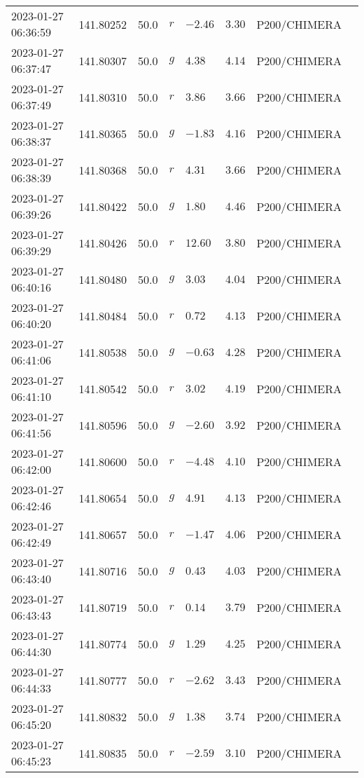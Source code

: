 \documentclass{nature_plusfigure}
\begin{document}
\begin{supplement}
\begin{center}
\begin{longtable}{llllllll}
2023-01-27 06:36:59 & 141.80252 & 50.0 & $r$ & $-2.46$ & $3.30$ & P200/CHIMERA &  \\ 
2023-01-27 06:37:47 & 141.80307 & 50.0 & $g$ & $4.38$ & $4.14$ & P200/CHIMERA &  \\ 
2023-01-27 06:37:49 & 141.80310 & 50.0 & $r$ & $3.86$ & $3.66$ & P200/CHIMERA &  \\ 
2023-01-27 06:38:37 & 141.80365 & 50.0 & $g$ & $-1.83$ & $4.16$ & P200/CHIMERA &  \\ 
2023-01-27 06:38:39 & 141.80368 & 50.0 & $r$ & $4.31$ & $3.66$ & P200/CHIMERA &  \\ 
2023-01-27 06:39:26 & 141.80422 & 50.0 & $g$ & $1.80$ & $4.46$ & P200/CHIMERA &  \\ 
2023-01-27 06:39:29 & 141.80426 & 50.0 & $r$ & $12.60$ & $3.80$ & P200/CHIMERA &  \\ 
2023-01-27 06:40:16 & 141.80480 & 50.0 & $g$ & $3.03$ & $4.04$ & P200/CHIMERA &  \\ 
2023-01-27 06:40:20 & 141.80484 & 50.0 & $r$ & $0.72$ & $4.13$ & P200/CHIMERA &  \\ 
2023-01-27 06:41:06 & 141.80538 & 50.0 & $g$ & $-0.63$ & $4.28$ & P200/CHIMERA &  \\ 
2023-01-27 06:41:10 & 141.80542 & 50.0 & $r$ & $3.02$ & $4.19$ & P200/CHIMERA &  \\ 
2023-01-27 06:41:56 & 141.80596 & 50.0 & $g$ & $-2.60$ & $3.92$ & P200/CHIMERA &  \\ 
2023-01-27 06:42:00 & 141.80600 & 50.0 & $r$ & $-4.48$ & $4.10$ & P200/CHIMERA &  \\ 
2023-01-27 06:42:46 & 141.80654 & 50.0 & $g$ & $4.91$ & $4.13$ & P200/CHIMERA &  \\ 
2023-01-27 06:42:49 & 141.80657 & 50.0 & $r$ & $-1.47$ & $4.06$ & P200/CHIMERA &  \\ 
2023-01-27 06:43:40 & 141.80716 & 50.0 & $g$ & $0.43$ & $4.03$ & P200/CHIMERA &  \\ 
2023-01-27 06:43:43 & 141.80719 & 50.0 & $r$ & $0.14$ & $3.79$ & P200/CHIMERA &  \\ 
2023-01-27 06:44:30 & 141.80774 & 50.0 & $g$ & $1.29$ & $4.25$ & P200/CHIMERA &  \\ 
2023-01-27 06:44:33 & 141.80777 & 50.0 & $r$ & $-2.62$ & $3.43$ & P200/CHIMERA &  \\ 
2023-01-27 06:45:20 & 141.80832 & 50.0 & $g$ & $1.38$ & $3.74$ & P200/CHIMERA &  \\ 
2023-01-27 06:45:23 & 141.80835 & 50.0 & $r$ & $-2.59$ & $3.10$ & P200/CHIMERA &  \\ 

\end{longtable}
\end{center}
\end{supplement}
\end{document}
